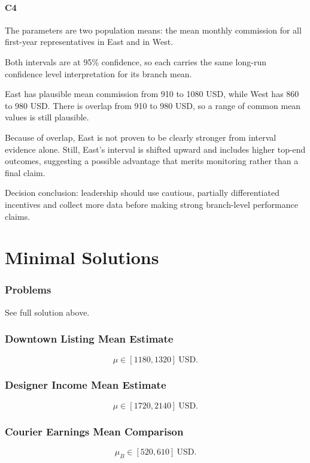 \begin{ExamProblems}
		\subsection*{C4}
		The parameters are two population means: the mean monthly commission for all first-year representatives in East and in West.

		Both intervals are at 95\% confidence, so each carries the same long-run confidence level interpretation for its branch mean.

		East has plausible mean commission from 910 to 1080 USD, while West has 860 to 980 USD.
		There is overlap from 910 to 980 USD, so a range of common mean values is still plausible.

		Because of overlap, East is not proven to be clearly stronger from interval evidence alone.
		Still, East's interval is shifted upward and includes higher top-end outcomes, suggesting a possible advantage that merits monitoring rather than a final claim.

		Decision conclusion: leadership should use cautious, partially differentiated incentives and collect more data before making strong branch-level performance claims.

	\end{ExamProblems}


\part{Minimal Solutions}

\section*{Problems}
See full solution above.

\section*{Downtown Listing Mean Estimate}
\[\mu \in [1180, 1320]\ \text{USD}.\]

\section*{Designer Income Mean Estimate}
\[\mu \in [1720, 2140]\ \text{USD}.\]

\section*{Courier Earnings Mean Comparison}
\[\mu_B \in [520, 610]\ \text{USD}.\]

